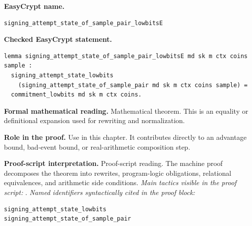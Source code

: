 \begin{formaltheorem}
\noindent\textbf{EasyCrypt name.}
\begin{lstlisting}[language=EasyCrypt,basicstyle=\ttfamily\scriptsize]
signing_attempt_state_of_sample_pair_lowbitsE
\end{lstlisting}
\noindent\textbf{Checked EasyCrypt statement.}
\begin{lstlisting}[language=EasyCrypt,basicstyle=\ttfamily\scriptsize]
lemma signing_attempt_state_of_sample_pair_lowbitsE md sk m ctx coins sample :
  signing_attempt_state_lowbits
    (signing_attempt_state_of_sample_pair md sk m ctx coins sample) =
  commitment_lowbits md sk m ctx coins.
\end{lstlisting}
\noindent\textbf{Formal mathematical reading.}
Mathematical theorem. This is an equality or definitional expansion used for rewriting and normalization.

\noindent\textbf{Role in the proof.}
Use in this chapter. It contributes directly to an advantage bound, bad-event bound, or real-arithmetic composition step.

\noindent\textbf{Proof-script interpretation.}
Proof-script reading. The machine proof decomposes the theorem into rewrites, program-logic obligations, relational equivalences, and arithmetic side conditions.
\emph{Main tactics visible in the proof script:} .
\emph{Named identifiers syntactically cited in the proof block:}
\begin{lstlisting}[language=EasyCrypt,basicstyle=\ttfamily\scriptsize]
signing_attempt_state_lowbits
signing_attempt_state_of_sample_pair
\end{lstlisting}

\end{formaltheorem}

